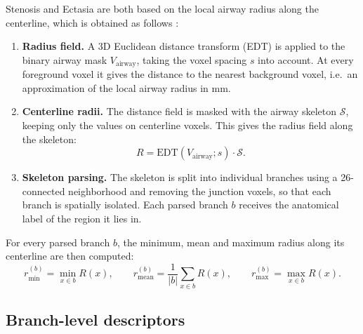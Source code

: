 Stenosis and Ectasia are both based on the local airway radius along the centerline, which is
obtained as follows \cite{zhang2025airmorph}:
\begin{enumerate}                        %
  \item \textbf{Radius field.} A 3D Euclidean distance transform (EDT) is applied to the
        binary airway mask $V_{\mathrm{airway}}$, taking the voxel spacing $s$ into
        account. At every foreground voxel it gives the distance to the nearest background
        voxel, i.e.\ an approximation of the local airway radius in mm.
  \item \textbf{Centerline radii.} The distance field is masked with the airway skeleton
        $\mathcal{S}$, keeping only the values on centerline voxels. This gives the
        radius field along the skeleton:
        \begin{equation}
          R = \mathrm{EDT}(V_{\mathrm{airway}}; s) \cdot \mathcal{S}.
          \label{eq:morph_radius}        %
        \end{equation}
  \item \textbf{Skeleton parsing.} The skeleton is split into individual branches using a
        26-connected neighborhood and removing the junction voxels, so that each branch is
        spatially isolated. Each parsed branch $b$ receives the anatomical label of the
        region it lies in.
\end{enumerate}
For every parsed branch $b$, the minimum, mean and maximum radius along its centerline are
then computed:
\begin{equation}
  r^{(b)}_{\min} = \min_{x \in b} R(x), \qquad
  r^{(b)}_{\mathrm{mean}} = \frac{1}{|b|} \sum_{x \in b} R(x), \qquad
  r^{(b)}_{\max} = \max_{x \in b} R(x).
  \label{eq:morph_rstats}                %
\end{equation}

\subsection{Branch-level descriptors}    %
\label{sec:morph_branch}                 %

